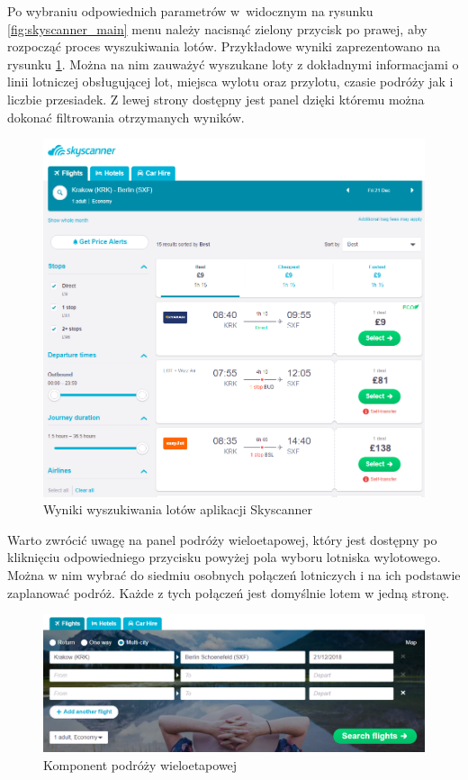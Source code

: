 \documentclass[12pt, twoside]{report}
\begin{document}
Po wybraniu odpowiednich parametrów w~widocznym na rysunku \ref{fig:skyscanner_main} menu należy nacisnąć zielony przycisk po prawej, aby rozpocząć proces wyszukiwania lotów. Przykładowe wyniki zaprezentowano na rysunku \ref{fig:skyscanner_result}. Można na nim zauważyć wyszukane loty z dokładnymi informacjami o linii lotniczej obsługującej lot, miejsca wylotu oraz przylotu, czasie podróży jak i liczbie przesiadek. Z lewej strony dostępny jest panel dzięki któremu można dokonać filtrowania otrzymanych wyników.

\begin{figure}[!ht]
\centering
\includegraphics[scale=0.45, keepaspectratio]{skyscanner_result.png}
\caption{Wyniki wyszukiwania lotów aplikacji Skyscanner}
\label{fig:skyscanner_result}
\end{figure}


Warto zwrócić uwagę na panel podróży wieloetapowej, który jest dostępny po kliknięciu  odpowiedniego przycisku powyżej pola wyboru lotniska wylotowego. Można w nim wybrać do siedmiu osobnych połączeń lotniczych i na ich podstawie zaplanować podróż. Każde z tych połączeń jest domyślnie lotem w jedną stronę.
 
\begin{figure}[!ht]
\centering
\includegraphics[scale=0.50, keepaspectratio]{skyscanner_multi.png}
\caption{Komponent podróży wieloetapowej}
\label{fig:skyscanner_multi}
\end{figure}
\end{document}
